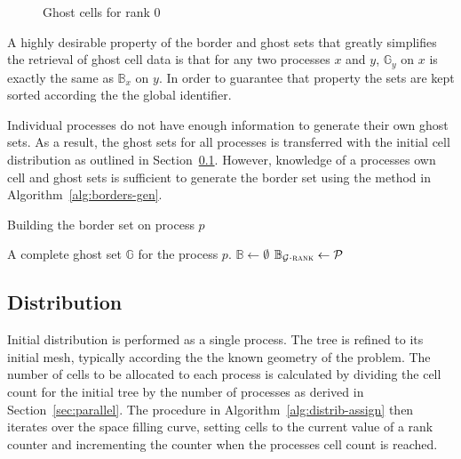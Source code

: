 \documentclass[twoside]{IIBproject}
\newcommand{\vect} [1] {\bm{#1}}
\newcommand{\acc}{{\mkern 0.5mu\cdot\mkern 0.5mu}}
\numberwithin{figure}{section}
\begin{document}
        \begin{figure}[H]
            
            \caption{Ghost cells for rank 0}
            \label{fig:borders-r0}
        \end{figure}

        A highly desirable property of the border and ghost sets that greatly simplifies the retrieval of ghost cell data is that for any two processes $x$ and $y$, $\mathbb{G}_y$ on $x$ is exactly the same as $\mathbb{B}_x$ on $y$. In order to guarantee that property the sets are kept sorted according the the global identifier.

        Individual processes do not have enough information to generate their own ghost sets. As a result, the ghost sets for all processes is transferred with the initial cell distribution as outlined in Section~\ref{sec:distribution}. However, knowledge of a processes own cell and ghost sets is sufficient to generate the border set using the method in Algorithm~\ref{alg:borders-gen}.

        \begin{algorithm}[H]
            \caption{Building the border set on process $p$}
            \label{alg:borders-gen}

            \begin{algorithmic}
                \Require A complete ghost set $\mathbb{G}$ for the process $p$.
                \Statex
                \State $\mathbb{B} \gets \emptyset$
                    \ForEach {poisson neighbour $\mathcal{P} \in \mathcal{G}\acc\vect{\mathcal{P}}$}
                        \If {$\mathcal{P}\acc\textproc{rank} = p$}
                            \State $\mathbb{B}_{\mathcal{G}\acc\textproc{rank}} \gets \mathcal{P}$
                        \EndIf
                    \EndFor
                \EndFor
            \end{algorithmic}
        \end{algorithm}



    \subsection{Distribution} %
        \label{sec:distribution}

        Initial distribution is performed as a single process. The tree is refined to its initial mesh, typically according the the known geometry of the problem. The number of cells to be allocated to each process is calculated by dividing the cell count for the initial tree by the number of processes as derived in Section~\ref{sec:parallel}. The procedure in Algorithm~\ref{alg:distrib-assign} then iterates over the space filling curve, setting cells to the current value of a rank counter and incrementing the counter when the processes cell count is reached.
\end{document}
